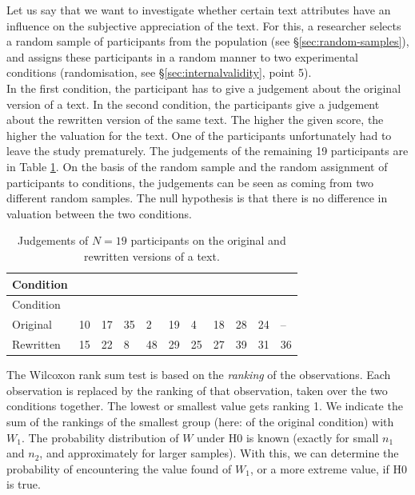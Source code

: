 \documentclass[
]{book}
\begin{document}
Let us say that we want to investigate whether certain text attributes
have an influence on the subjective appreciation of the text. For this,
a researcher selects a random sample of participants
from the population (see
§\ref{sec:random-samples}), and assigns these participants in a random
manner to two experimental conditions (randomisation, see
§\ref{sec:internalvalidity}, point 5).\\
In the first condition, the participant has to give a judgement about
the original version of a text. In the second condition, the participants
give a judgement about the rewritten version of the same text.
The higher the given score, the higher the valuation for the text.
One of the participants unfortunately had to leave the study
prematurely. The judgements of the remaining 19 participants
are in Table \ref{tab:data-originalrewritten}. On the basis of the random
sample and the random assignment of participants to conditions,
the judgements can be seen as coming from two different
random samples. The null hypothesis is that there is no difference
in valuation between the two conditions.

\begin{longtable}[]{@{}lllllllllll@{}}
\caption{\label{tab:data-originalrewritten} Judgements of \(N=19\) participants on
the original and rewritten versions of a text.}\tabularnewline
\toprule\noalign{}
Condition & & & & & & & & & & \\
\midrule\noalign{}
\endfirsthead
\toprule\noalign{}
Condition & & & & & & & & & & \\
\midrule\noalign{}
\endhead
\bottomrule\noalign{}
\endlastfoot
Original & 10 & 17 & 35 & 2 & 19 & 4 & 18 & 28 & 24 & -- \\
Rewritten & 15 & 22 & 8 & 48 & 29 & 25 & 27 & 39 & 31 & 36 \\
\end{longtable}

The Wilcoxon rank sum test is based on the \emph{ranking} of the
observations. Each observation is replaced by the ranking of
that observation, taken over the two conditions together. The lowest or
smallest value gets ranking 1. We indicate the sum of the rankings of the
smallest group (here: of the original condition) with
\(W_1\). The probability distribution of \(W\) under H0 is known (exactly for small
\(n_1\) and \(n_2\), and approximately for larger samples). With this, we can
determine the probability of encountering the value found of \(W_1\),
or a more extreme value, if H0 is true.
\end{document}
